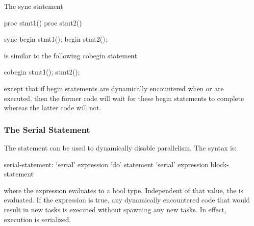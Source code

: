 \begin{example}
The sync statement
\begin{chapelpre}
proc stmt1() { }
proc stmt2() { }
\end{chapelpre}
\begin{chapel}
sync {
  begin stmt1();
  begin stmt2();
}
\end{chapel}
is similar to the following cobegin statement
\begin{chapel}
cobegin {
  stmt1();
  stmt2();
}
\end{chapel}
\begin{chapeloutput}
\end{chapeloutput}
except that if begin statements are dynamically encountered
when  or  are executed, then the former
code will wait for these begin statements to complete whereas the
latter code will not.
\end{example}

\subsubsection{The Serial Statement}
\label{Serial}

The  statement can be used to dynamically disable
parallelism.  The syntax is:
\begin{syntax}
serial-statement:
  `serial' expression `do' statement
  `serial' expression block-statement
\end{syntax}
where the expression evaluates to a bool type.  Independent of that
value, the  is evaluated. If the expression is true,
any dynamically encountered code that would result in new tasks is
executed without spawning any new tasks.  In effect, execution is
serialized.

